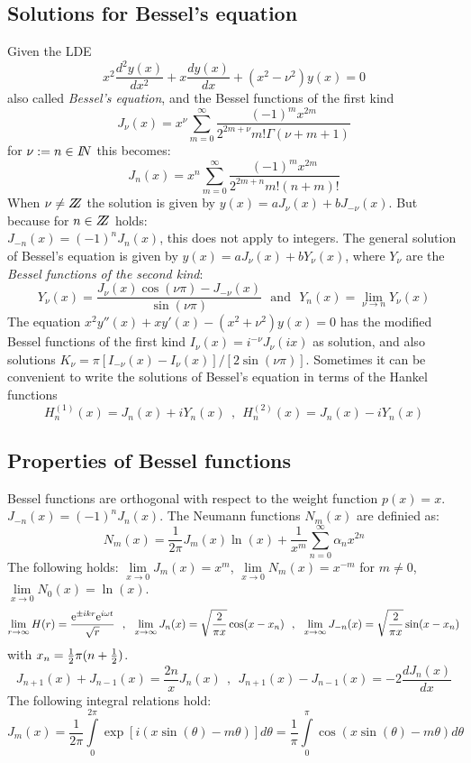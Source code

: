 \documentclass[twoside]{report}
\begin{document}
\subsection{Solutions for Bessel's equation}
Given the LDE
\[
x^2\frac{d^2y(x)}{dx^2}+x\frac{dy(x)}{dx}+(x^2-\nu^2)y(x)=0
\]
also called {\it Bessel's equation}, and the Bessel functions of the first
kind
\[
J_\nu(x)=x^\nu\sum_{m=0}^\infty\frac{(-1)^mx^{2m}}{2^{2m+\nu}m!\Gamma(\nu+m+1)}
\]
for $\nu:=n\in I\hspace{-1mm}N$ this becomes:
\[
J_n(x)=x^n\sum_{m=0}^\infty\frac{(-1)^mx^{2m}}{2^{2m+n}m!(n+m)!}
\]
When $\nu\neq Z\hspace{-1ex}Z$ the solution is given by $y(x)=aJ_\nu(x)+bJ_{-\nu}(x)$.
But because for $n\in Z\hspace{-1ex}Z$ holds:\\ $J_{-n}(x)=(-1)^nJ_n(x)$, this does not
apply to integers. The general solution of Bessel's equation is given by
$y(x)=aJ_\nu(x)+bY_\nu(x)$, where $Y_\nu$ are the {\it Bessel functions of the
second kind}:
\[
Y_\nu(x)=\frac{J_\nu(x)\cos(\nu\pi)-J_{-\nu}(x)}{\sin(\nu\pi)}~~~\mbox{and}~~~
Y_n(x)=\lim_{\nu\rightarrow n}Y_\nu(x)
\]
The equation $x^2y''(x)+xy'(x)-(x^2+\nu^2)y(x)=0$ has the modified
Bessel functions of the first kind $I_\nu(x)=i^{-\nu}J_\nu(ix)$ as solution,
and also solutions $K_\nu=\pi[I_{-\nu}(x)-I_\nu(x)]/[2\sin(\nu\pi)]$.
\npar
Sometimes it can be convenient to write the solutions of Bessel's equation in
terms of the Hankel functions
\[
H^{(1)}_n(x)=J_n(x)+iY_n(x)~~,~~H^{(2)}_n(x)=J_n(x)-iY_n(x)
\]

\subsection{Properties of Bessel functions}
Bessel functions are orthogonal with respect to the weight function $p(x)=x$.
\npar
$J_{-n}(x)=(-1)^nJ_n(x)$. The Neumann functions $N_m(x)$ are definied as:
\[
N_m(x)=\frac{1}{2\pi}J_m(x)\ln(x)+\frac{1}{x^m}\sum_{n=0}^\infty \alpha_nx^{2n}
\]
The following holds: $\lim\limits_{x\rightarrow0}J_m(x)=x^m$,
$\lim\limits_{x\rightarrow0}N_m(x)=x^{-m}$ for $m\neq0$,
$\lim\limits_{x\rightarrow0}N_0(x)=\ln(x)$.
\[
\lim_{r\rightarrow\infty}H(r)=\frac{{\rm e}^{\pm ikr}{\rm e}^{i\omega t}}{\sqrt{r}}~~,~~
\lim_{x\rightarrow\infty}J_n(x)=\sqrt{\frac{2}{\pi x}}\cos(x-x_n)~~,~~
\lim_{x\rightarrow\infty}J_{-n}(x)=\sqrt{\frac{2}{\pi x}}\sin(x-x_n)
\]
with $x_n=\mbox{$\frac{1}{2}$}\pi(n+\mbox{$\frac{1}{2}$})$.
\[
J_{n+1}(x)+J_{n-1}(x)=\frac{2n}{x}J_n(x)~~,~~J_{n+1}(x)-J_{n-1}(x)=-2\frac{dJ_n(x)}{dx}
\]
The following integral relations hold:
\[
J_m(x)=\frac{1}{2\pi}\int\limits_0^{2\pi}\exp[i(x\sin(\theta)-m\theta)]d\theta=
\frac{1}{\pi}\int\limits_0^\pi\cos(x\sin(\theta)-m\theta)d\theta
\]
\end{document}
